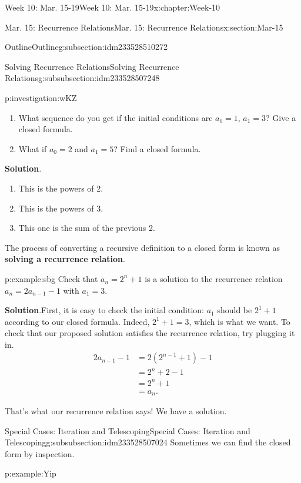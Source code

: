 \documentclass[oneside,10pt,]{book}
\newcommand{\blocktitlefont}{\relax}
\newcommand{\terminology}[1]{\textbf{#1}}
\numberwithin{equation}{section}
\newcommand{\amp}{&}
\begin{document}
\begin{chapterptx}{Week 10: Mar. 15-19}{}{Week 10: Mar. 15-19}{}{}{x:chapter:Week-10}
\begin{sectionptx}{Mar. 15: Recurrence Relations}{}{Mar. 15: Recurrence Relations}{}{}{x:section:Mar-15}
\begin{subsectionptx}{Outline}{}{Outline}{}{}{g:subsection:idm233528510272}
\begin{subsubsectionptx}{Solving Recurrence Relations}{}{Solving Recurrence Relations}{}{}{g:subsubsection:idm233528507248}
\begin{investigation}{}{p:investigation:wKZ}
\begin{enumerate}
\item{}What sequence do you get if the initial conditions are \(a_0 = 1\), \(a_1 = 3\)? Give a closed formula.%
\item{}What if \(a_0 = 2\) and \(a_1 = 5\)? Find a closed formula.%
\end{enumerate}
%
\par\smallskip%
\noindent\textbf{\blocktitlefont Solution}.\hypertarget{g:solution:idm233528497616}{}\quad{}%
\begin{enumerate}
\item{}This is the powers of 2.%
\item{}This is the powers of 3.%
\item{}This one is the sum of the previous 2.%
\end{enumerate}
\end{investigation}%
The process of converting a recursive definition to a closed form is known as \terminology{solving a recurrence relation}.%
\begin{example}{}{p:example:sbg}%
Check that \(a_n = 2^n + 1\) is a solution to the recurrence relation \(a_n = 2a_{n-1} - 1\) with \(a_1 = 3\).%
\par\smallskip%
\noindent\textbf{\blocktitlefont Solution}.\hypertarget{p:solution:IZr}{}\quad{}First, it is easy to check the initial condition: \(a_1\) should be \(2^1 + 1\) according to our closed formula. Indeed, \(2^1 + 1 = 3\), which is what we want. To check that our proposed solution satisfies the recurrence relation, try plugging it in.%
\begin{align*}
2a_{n-1} - 1 \amp = 2(2^{n-1} + 1) - 1\\
\amp = 2^n + 2 - 1\\
\amp = 2^n +1\\
\amp = a_n\text{.}
\end{align*}
%
\par
That's what our recurrence relation says! We have a solution.%
\end{example}
\end{subsubsectionptx}
%
%
\typeout{************************************************}
\typeout{************************************************}
%
\begin{subsubsectionptx}{Special Cases: Iteration and Telescoping}{}{Special Cases: Iteration and Telescoping}{}{}{g:subsubsection:idm233528507024}
Sometimes we can find the closed form by inspection.%
\begin{example}{}{p:example:Yip}%

\end{example}
\end{subsubsectionptx}
\end{subsectionptx}
\end{sectionptx}
\end{chapterptx}
\end{document}
